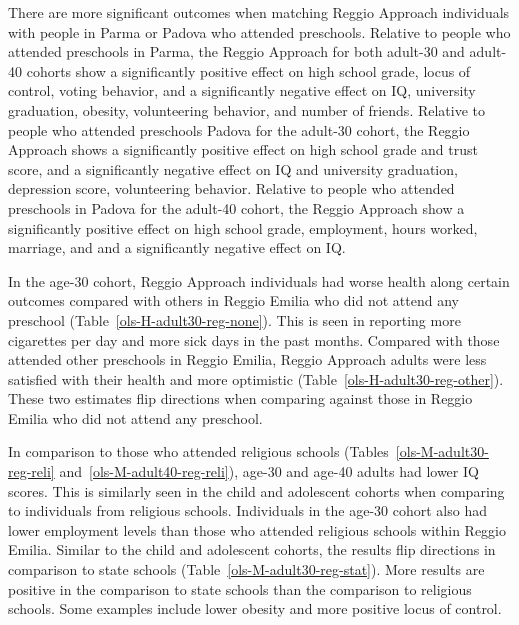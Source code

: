 There are more significant outcomes when matching Reggio Approach individuals with people in Parma or Padova who attended preschools. Relative to people who attended preschools in Parma, the Reggio Approach for both adult-30 and adult-40 cohorts show a significantly positive effect on high school grade, locus of control, voting behavior, and a significantly negative effect on IQ, university graduation, obesity, volunteering behavior, and number of friends. Relative to people who attended preschools Padova for the adult-30 cohort, the Reggio Approach shows a significantly positive effect on high school grade and trust score, and a significantly negative effect on IQ and university graduation, depression score, volunteering behavior. Relative to people who attended preschools in Padova for the adult-40 cohort, the Reggio Approach show a significantly positive effect on high school grade, employment, hours worked, marriage, and  and a significantly negative effect on IQ. 

In the age-30 cohort, Reggio Approach individuals had worse health along certain outcomes compared with others in Reggio Emilia who did not attend any preschool (Table~\ref{ols-H-adult30-reg-none}). This is seen in reporting more cigarettes per day and more sick days in the past months. Compared with those attended other preschools in Reggio Emilia, Reggio Approach adults were less satisfied with their health and more optimistic (Table~\ref{ols-H-adult30-reg-other}). These two estimates flip directions when comparing against those in Reggio Emilia who did not attend any preschool. 

In comparison to those who attended religious schools (Tables~\ref{ols-M-adult30-reg-reli} and~\ref{ols-M-adult40-reg-reli}), age-30 and age-40 adults had lower IQ scores. This is similarly seen in the child and adolescent cohorts when comparing to individuals from religious schools. Individuals in the age-30 cohort also had lower employment levels than those who attended religious schools within Reggio Emilia. Similar to the child and adolescent cohorts, the results flip directions in comparison to state schools (Table~\ref{ols-M-adult30-reg-stat}). More results are positive in the comparison to state schools than the comparison to religious schools. Some examples include lower obesity and more positive locus of control.


